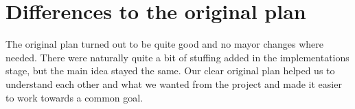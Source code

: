 
\section{Differences to the original plan}
	


The original plan turned out to be quite good and no mayor changes where needed. There were naturally quite a bit of stuffing added in the implementations stage, but the main idea stayed the same. Our clear original plan helped us to understand each other and what we wanted from the project and made it easier to work towards a common goal.